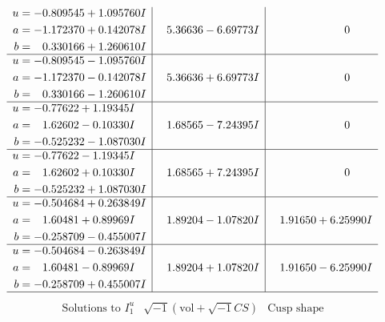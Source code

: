 \documentclass[1p]{elsarticle_modified}
\theoremstyle{definition}
\newcommand{\I}{\sqrt{-1}}
\begin{document}
$$\begin{array}{c|c|c}
\begin{aligned}
u &= -0.809545 + 1.095760 I \\
a &= -1.172370 + 0.142078 I \\
b &= \phantom{-}0.330166 + 1.260610 I\end{aligned}
 & \phantom{-}5.36636 - 6.69773 I & \phantom{-0.000000 } 0 \\ \hline\begin{aligned}
u &= -0.809545 - 1.095760 I \\
a &= -1.172370 - 0.142078 I \\
b &= \phantom{-}0.330166 - 1.260610 I\end{aligned}
 & \phantom{-}5.36636 + 6.69773 I & \phantom{-0.000000 } 0 \\ \hline\begin{aligned}
u &= -0.77622 + 1.19345 I \\
a &= \phantom{-}1.62602 - 0.10330 I \\
b &= -0.525232 - 1.087030 I\end{aligned}
 & \phantom{-}1.68565 - 7.24395 I & \phantom{-0.000000 } 0 \\ \hline\begin{aligned}
u &= -0.77622 - 1.19345 I \\
a &= \phantom{-}1.62602 + 0.10330 I \\
b &= -0.525232 + 1.087030 I\end{aligned}
 & \phantom{-}1.68565 + 7.24395 I & \phantom{-0.000000 } 0 \\ \hline\begin{aligned}
u &= -0.504684 + 0.263849 I \\
a &= \phantom{-}1.60481 + 0.89969 I \\
b &= -0.258709 - 0.455007 I\end{aligned}
 & \phantom{-}1.89204 - 1.07820 I & \phantom{-}1.91650 + 6.25990 I \\ \hline\begin{aligned}
u &= -0.504684 - 0.263849 I \\
a &= \phantom{-}1.60481 - 0.89969 I \\
b &= -0.258709 + 0.455007 I\end{aligned}
 & \phantom{-}1.89204 + 1.07820 I & \phantom{-}1.91650 - 6.25990 I\\
 \hline 
 \end{array}$$\newpage$$\begin{array}{c|c|c}  
\text{Solutions to }I^u_{1}& \I (\text{vol} + \sqrt{-1}CS) & \text{Cusp shape}\\
 \hline 
\begin{aligned}

\end{aligned}
\end{array}$$
\end{document}
